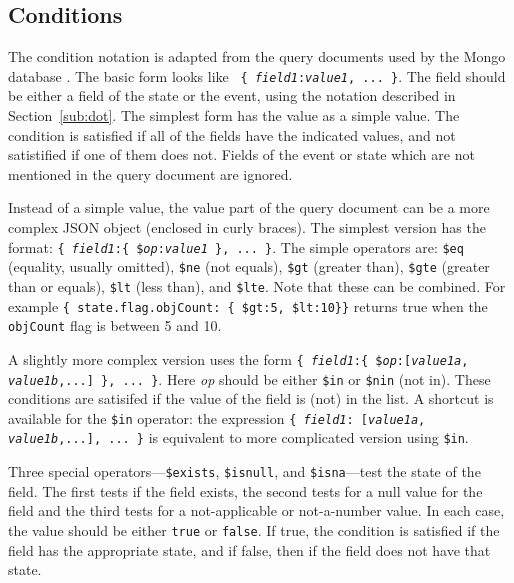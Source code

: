 \documentclass{article}
\begin{document}
  \subsection{Conditions}
  \label{sub:cond}

  The condition notation is adapted from the query documents used by
  the Mongo database \cite{Mongo}.  The basic form looks like \texttt{
    \{ \textit{field1}:\textit{value1}, ... \}}.  The field should be
  either a field of the state or the event, using the notation
  described in Section~\ref{sub:dot}.  The simplest form has the value
  as a simple value.  The condition is satisfied if all of the fields
  have the indicated values, and not satistified if one of them does
  not.  Fields of the event or state which are not mentioned in the
  query document are ignored.

  Instead of a simple value, the value part of the query document can
  be a more complex JSON object (enclosed in curly braces).  The
  simplest version has the format:  \texttt{\{ \textit{field1}:\{
    \$\textit{op}:\textit{value1} \}, ... \}}.  The simple operators
  are: \texttt{\$eq} (equality, usually omitted), \texttt{\$ne} (not
  equals), \texttt{\$gt} (greater than), \texttt{\$gte} (greater than
  or equals), \texttt{\$lt} (less than), and \texttt{\$lte}.  Note
  that these can be combined.  For example
  \verb|{ state.flag.objCount: { $gt:5, $lt:10}}| returns true when
  the \texttt{objCount} flag is between 5 and 10.

  A slightly more complex version uses the form \texttt{\{ \textit{field1}:\{
    \$\textit{op}:[\textit{value1a}, \textit{value1b},...] \},
    ... \}}.  Here \textit{op} should be either \texttt{\$in} or
  \texttt{\$nin} (not in).  These conditions are satisifed if the
  value of the field is (not) in the list.  A shortcut is available
  for the \texttt{\$in} operator:  the expression \texttt{\{
    \textit{field1}: [\textit{value1a}, \textit{value1b},...], ... \}}
  is equivalent to more complicated version using \texttt{\$in}.

  Three special operators---\texttt{\$exists}, \texttt{\$isnull}, and
  \texttt{\$isna}---test the state of the field.  The first tests if
  the field exists, the second tests for a null value for the field
  and the third tests for a not-applicable or not-a-number value.  In
  each case, the value should be either \texttt{true} or
  \texttt{false}.  If true, the condition is satisfied if the field
  has the appropriate state, and if false, then if the field does not
  have that state.
\end{document}
